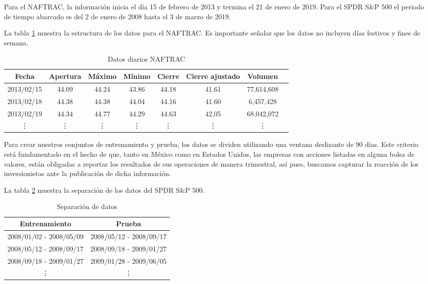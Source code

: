\documentclass[onesided, 12pt]{scrbook}
\theoremstyle{break}
\begin{document}
Para el NAFTRAC, la información inicia el día 15 de febrero de 2013 y termina el 21 de enero de 2019. Para el SPDR S\&P 500 el periodo de tiempo abarcado es del 2 de enero de 2008 hasta  el 3 de marzo de 2019.

La tabla \ref{tabla:Ejemplo datos diarios NAFTRAC} muestra la estructura de los datos para el NAFTRAC. Es importante señalar que los datos no incluyen días festivos y fines de semana.

\begin{table}[h]
\centering
\begin{tabular}{cccccccc}
\hline
\textbf{Fecha} & \textbf{Apertura} & \textbf{Máximo} & \textbf{Mínimo} & \textbf{Cierre} & \textbf{Cierre ajustado} & \textbf{Volumen} \\
\hline
2013/02/15 & 44.09 & 44.24 & 43.86 & 44.18 & 41.61 & 77,614,608\\
2013/02/18 & 44.38 & 44.38 & 44.04 & 44.16 & 41.60 & 6,457,428\\
2013/02/19 & 44.34 & 44.77 & 44.29 & 44.63 & 42.05 & 68,042,072\\
\vdots & \vdots & \vdots & \vdots & \vdots & \vdots & \vdots \\
\hline
\end{tabular}
\caption{\label{tabla:Ejemplo datos diarios NAFTRAC} Datos diarios NAFTRAC}
\end{table}

Para crear nuestros conjuntos de entrenamiento y prueba, los datos se dividen utilizando una ventana deslizante de 90 días. Este criterio está fundamentado en el hecho de que, tanto en México como en Estados Unidos, las empresas con acciones listadas en alguna bolsa de valores, están obligadas a reportar los resultados de sus operaciones de manera trimestral, así pues, buscamos capturar la reacción de los inversionistas ante la publicación de dicha información.

La tabla \ref{tabla:data split SP500} muestra la separación de los datos del SPDR S\&P 500.
\begin{table}[h]
\centering
\begin{tabular}{cc}
\hline
\textbf{Entrenamiento} & \textbf{Prueba} \\
\hline
2008/01/02 - 2008/05/09 & 2008/05/12 - 2008/09/17 \\
2008/05/12 - 2008/09/17 & 2008/09/18 - 2009/01/27 \\
2008/09/18 - 2009/01/27 & 2009/01/28 - 2009/06/05 \\
\vdots & \vdots \\
\hline
\end{tabular}
\caption{\label{tabla:data split SP500} Separación de datos}
\end{table}
\end{document}
